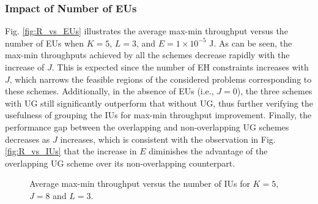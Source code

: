 \documentclass[12pt,draftclsnofoot, onecolumn]{IEEEtran}
\theoremstyle{plain}
\begin{document}
\begin{sloppypar}
\subsubsection{Impact of Number of EUs}
Fig. \ref{fig:R_vs_EUs} illustrates the average max-min throughput versus the number of EUs when $K = 5$, $L = 3$, and $E = 1\times10^{-5}$ J. As can be seen, the max-min throughputs achieved by all the schemes decrease rapidly with the increase of $J$. This is expected since the number of EH constraints increases with $J$, which narrows the feasible regions of the considered problems corresponding to these schemes. Additionally, in the absence of EUs (i.e., $J = 0$), the three schemes with UG still significantly outperform that without UG, thus further verifying the usefulness of grouping the IUs for max-min throughput improvement. Finally, the performance gap between the overlapping and non-overlapping UG schemes decreases as $J$ increases, which is consistent with the observation in Fig. \ref{fig:R_vs_IUs} that the increase in $E$ diminishes the advantage of the overlapping UG scheme over its non-overlapping counterpart.   

\begin{figure}[!t]
	\hspace{-4.5mm}
	\hspace{-8.5mm}
	\vspace{-1mm}
	\caption{Average max-min throughput versus the number of IUs for $K = 5$, $J = 8$ and $L = 3$.}
	\label{fig:R_vs_N}
	\vspace{-3mm}
\end{figure}


\end{sloppypar}
\end{document}
